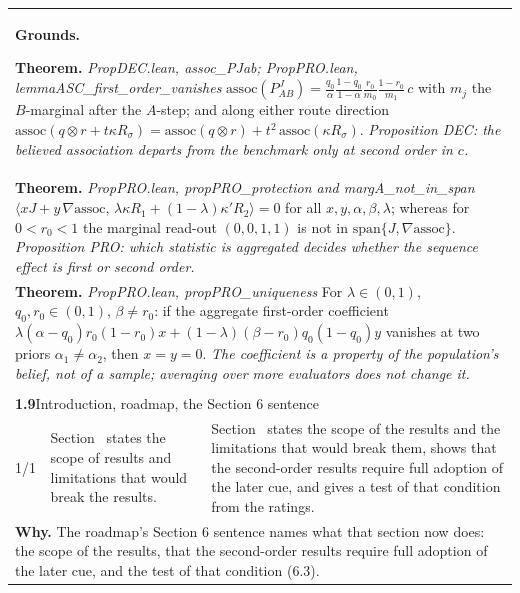 \documentclass[10pt]{article}
\theoremstyle{definition}
\renewcommand{\ref}[1]{\textsc{\detokenize{#1}}}
\newlength{\fullw}\setlength{\fullw}{25.9cm}
\newcommand{\entryhead}[2]{\multicolumn{3}{|l|}{\rule{0pt}{2.6ex}\large\textbf{#1}\quad #2} \\ \hline}
\begin{document}
{\begin{longtable}{|p{0.9cm}|p{12.2cm}|p{12.2cm}|}
\multicolumn{3}{|p{\fullw}|}{\textbf{Grounds.}\par \textbf{Theorem.} \textit{PropDEC.lean, assoc\_PJab; PropPRO.lean, lemmaASC\_first\_order\_vanishes} \newline $\mathrm{assoc}(P^J_{AB}) = \frac{q_0}{\alpha}\frac{1-q_0}{1-\alpha}
\frac{r_0}{m_0}\frac{1-r_0}{m_1}\,c$ with $m_j$ the $B$-marginal after the
$A$-step; and along either route direction
$\mathrm{assoc}(q\otimes r + t\kappa R_\sigma) = \mathrm{assoc}(q\otimes r)
+ t^2\,\mathrm{assoc}(\kappa R_\sigma)$. \newline \textit{Proposition DEC: the believed association departs from the
benchmark only at second order in $c$.}} \\
\multicolumn{3}{|p{\fullw}|}{\textbf{Theorem.} \textit{PropPRO.lean, propPRO\_protection and margA\_not\_in\_span} \newline $\langle xJ + y\,\nabla\mathrm{assoc},\,\lambda\kappa R_1 + (1-\lambda)\kappa' R_2\rangle = 0$
for all $x,y,\alpha,\beta,\lambda$; whereas for $0<r_0<1$ the marginal read-out
$(0,0,1,1)$ is not in $\mathrm{span}\{J,\nabla\mathrm{assoc}\}$. \newline \textit{Proposition PRO: which statistic is aggregated decides whether the
sequence effect is first or second order.}} \\
\multicolumn{3}{|p{\fullw}|}{\textbf{Theorem.} \textit{PropPRO.lean, propPRO\_uniqueness} \newline For $\lambda\in(0,1)$, $q_0,r_0\in(0,1)$, $\beta\neq r_0$: if the
aggregate first-order coefficient
$\lambda(\alpha-q_0)r_0(1-r_0)x + (1-\lambda)(\beta-r_0)q_0(1-q_0)y$ vanishes at
two priors $\alpha_1\neq\alpha_2$, then $x=y=0$. \newline \textit{The coefficient is a property of the population's belief, not of a
sample; averaging over more evaluators does not change it.}} \\ \hline
\multicolumn{3}{|l|}{} \\ \hline
\entryhead{1.9}{Introduction, roadmap, the Section 6 sentence\quad{\footnotesize\textit{(formerly E.15r)}}}
1/1 & Section~\ref{sec:scope} states the scope of results and limitations that would break the results. & Section~\ref{sec:scope} states the scope of the results and the limitations that would break them, shows that the second-order results require full adoption of the later cue, and gives a test of that condition from the ratings. \\ \hline
\multicolumn{3}{|p{\fullw}|}{\textbf{Why.} The roadmap's Section 6 sentence names what that section now does: the scope of the results, that the second-order results require full adoption of the later cue, and the test of that condition (6.3).} \\

\end{longtable}}
\end{document}
